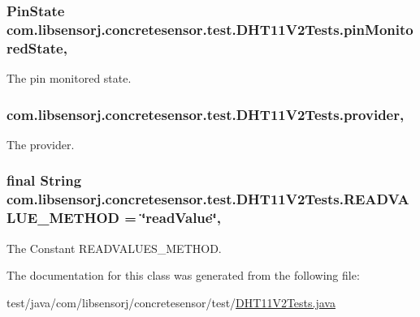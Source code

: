 \subsubsection[{pin\+Monitored\+State}]{\setlength{\rightskip}{0pt plus 5cm}Pin\+State com.\+libsensorj.\+concretesensor.\+test.\+D\+H\+T11\+V2\+Tests.\+pin\+Monitored\+State\hspace{0.3cm}{\ttfamily [static]}, {\ttfamily [private]}}\label{classcom_1_1libsensorj_1_1concretesensor_1_1test_1_1DHT11V2Tests_a85488d302d4cba874540ea6a2fe4f33d}
The pin monitored state. \hypertarget{classcom_1_1libsensorj_1_1concretesensor_1_1test_1_1DHT11V2Tests_a7aed1b77856a182c560a5c52da10cf65}{}
\subsubsection[{provider}]{ com.\+libsensorj.\+concretesensor.\+test.\+D\+H\+T11\+V2\+Tests.\+provider\hspace{0.3cm}{\ttfamily [static]}, {\ttfamily [private]}}\label{classcom_1_1libsensorj_1_1concretesensor_1_1test_1_1DHT11V2Tests_a7aed1b77856a182c560a5c52da10cf65}
The provider. \hypertarget{classcom_1_1libsensorj_1_1concretesensor_1_1test_1_1DHT11V2Tests_a0876151246714e9010ff4d00df631b7d}{}
\subsubsection[{R\+E\+A\+D\+V\+A\+L\+U\+E\+\_\+\+M\+E\+T\+H\+O\+D}]{\setlength{\rightskip}{0pt plus 5cm}final String com.\+libsensorj.\+concretesensor.\+test.\+D\+H\+T11\+V2\+Tests.\+R\+E\+A\+D\+V\+A\+L\+U\+E\+\_\+\+M\+E\+T\+H\+O\+D = \char`\"{}read\+Value\char`\"{}\hspace{0.3cm}{\ttfamily [static]}, {\ttfamily [private]}}\label{classcom_1_1libsensorj_1_1concretesensor_1_1test_1_1DHT11V2Tests_a0876151246714e9010ff4d00df631b7d}
The Constant R\+E\+A\+D\+V\+A\+L\+U\+E\+S\+\_\+\+M\+E\+T\+H\+O\+D. 

The documentation for this class was generated from the following file\+:\begin{DoxyCompactItemize}
\item 
test/java/com/libsensorj/concretesensor/test/\hyperlink{DHT11V2Tests_8java}{D\+H\+T11\+V2\+Tests.\+java}\end{DoxyCompactItemize}
